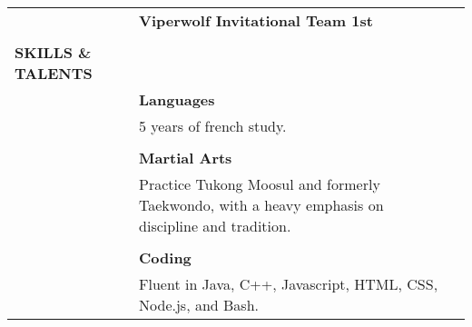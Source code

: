 \documentclass{article}
\begin{document}
\begin{tabularx}{\textwidth - 20pt}{l X l}
		&  \textbf{ Viperwolf Invitational Team 1st} & \\
		\\
		\textbf{SKILLS \& TALENTS} & & \\
		& \textbf{Languages} & \\
		& 5 years of french study. & \\
		\\
		& \textbf{Martial Arts} & \\
		& Practice Tukong Moosul and formerly Taekwondo, with a heavy emphasis on discipline and tradition.& \\
		\\
		& \textbf{Coding} & \\
		& Fluent in Java, C++, Javascript, HTML, CSS, Node.js, and Bash. & \\
	\end{tabularx}
\end{document}
